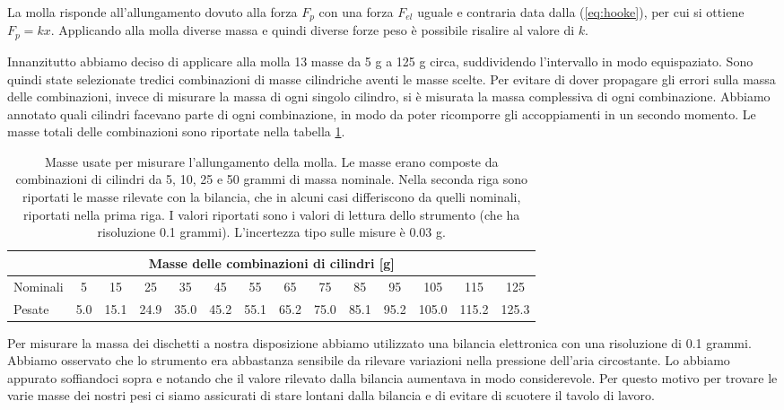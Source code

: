 La molla risponde all'allungamento dovuto alla forza $F_p$ con una forza $F_{el}$ uguale e contraria
data dalla (\ref{eq:hooke}),
per cui si ottiene $F_p = kx$. Applicando alla molla diverse massa e quindi diverse forze peso è possibile risalire al valore di $k$.

Innanzitutto abbiamo deciso di applicare alla molla 13 masse da 5 g a 125 g circa, suddividendo l'intervallo in modo equispaziato.
Sono quindi state selezionate tredici combinazioni di masse cilindriche aventi le masse scelte.
Per evitare di dover propagare gli errori sulla massa delle combinazioni, invece di misurare la massa di ogni singolo cilindro,
si è misurata la massa complessiva di ogni combinazione.
Abbiamo annotato quali cilindri facevano parte di ogni combinazione, in modo da poter ricomporre gli accoppiamenti in un secondo momento. Le masse totali delle combinazioni sono riportate nella tabella \ref{tab:masse}.

\begin{table}[tb]
    \centering
    \small
    \begin{tabular}{l | c c c c c c c c c c c c c}
        \multicolumn{14}{c}{\textbf{Masse delle combinazioni di cilindri [g]}} \\[1mm]
        \toprule
        Nominali & 5 & 15 & 25 & 35 & 45 & 55 & 65 & 75 & 85 & 95 & 105 & 115 & 125 \\
        Pesate & 5.0 & 15.1 & 24.9 & 35.0 & 45.2 & 55.1 & 65.2 & 75.0 & 85.1 & 95.2 & 105.0 & 115.2 & 125.3 \\
        \bottomrule
    \end{tabular}
    \caption{Masse usate per misurare l'allungamento della molla. Le masse erano composte da combinazioni
    di cilindri da 5, 10, 25 e 50 grammi di massa nominale. Nella seconda riga sono riportati le masse
    rilevate con la bilancia, che in alcuni casi differiscono da quelli nominali, riportati nella prima riga.
    I valori riportati sono i valori di lettura dello strumento (che ha risoluzione 0.1 grammi). L'incertezza tipo sulle misure
    è 0.03 g.}
    \label{tab:masse}
\end{table}

Per misurare la massa dei dischetti a nostra disposizione abbiamo utilizzato una bilancia elettronica con una risoluzione di 0.1 grammi. Abbiamo osservato che lo strumento era abbastanza sensibile da rilevare variazioni nella pressione dell'aria circostante. Lo abbiamo appurato soffiandoci sopra e notando che il valore rilevato dalla bilancia aumentava in modo considerevole. Per questo motivo per trovare le varie masse dei nostri pesi ci siamo assicurati di stare lontani dalla bilancia e di evitare di scuotere il tavolo di lavoro.

